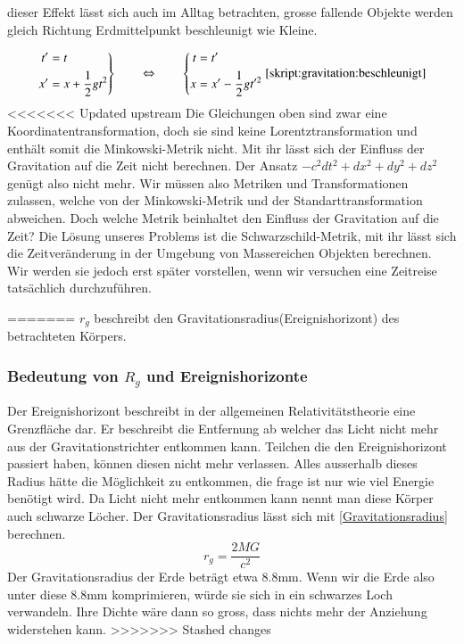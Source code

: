 \begin{refsection}
	dieser Effekt lässt sich auch im Alltag betrachten, grosse fallende Objekte werden gleich Richtung Erdmittelpunkt beschleunigt wie Kleine.
	
	\begin{equation}
	\left.
	\begin{aligned}
	t'&=t\\
	x'&=x+\frac12gt^2
	\end{aligned}
	\right\}
	\qquad
	\Leftrightarrow
	\qquad
	\left\{
	\begin{aligned}
	t&=t'\\
	x&=x'-\frac12gt'^2
	\end{aligned}
	\right.
	\eqref{skript:gravitation:beschleunigt}
	\end{equation}
<<<<<<< Updated upstream
	Die Gleichungen oben sind zwar eine Koordinatentransformation, doch sie sind keine Lorentztransformation und enthält somit die Minkowski-Metrik nicht. Mit ihr lässt sich der Einfluss der Gravitation auf die Zeit nicht berechnen. 
	Der Ansatz $ -c^2dt^2 + dx^2 + dy^2 + dz^2$ genügt also nicht mehr. Wir müssen also Metriken und Transformationen zulassen, welche von der Minkowski-Metrik und der Standarttransformation abweichen.
	Doch welche Metrik beinhaltet den Einfluss der Gravitation auf die Zeit? 
	Die Lösung unseres Problems ist die Schwarzschild-Metrik, mit ihr lässt sich die Zeitveränderung in der Umgebung von Massereichen Objekten berechnen. Wir werden sie jedoch erst später vorstellen, wenn wir versuchen eine Zeitreise tatsächlich durchzuführen. %
	
	
	
	
=======
	$r_g$ beschreibt den Gravitationsradius(Ereignishorizont) des betrachteten Körpers.
	\subsubsection{Bedeutung von $R_{g}$ und Ereignishorizonte}
	Der Ereignishorizont beschreibt in der allgemeinen Relativitätstheorie eine Grenzfläche dar. Er beschreibt die Entfernung ab welcher das Licht nicht mehr aus der Gravitationstrichter entkommen kann. Teilchen die den Ereignishorizont passiert haben, können diesen nicht mehr verlassen. Alles ausserhalb dieses Radius hätte die M\"oglichkeit zu entkommen, die frage ist nur wie viel Energie benötigt wird. Da Licht nicht mehr entkommen kann nennt man diese Körper auch schwarze Löcher.
	Der Gravitationsradius lässt sich mit \ref{Gravitationsradius} berechnen.
	\begin{equation} \label{Gravitationsradius}
		r_{g}= \frac{2MG}{c^2}
	\end{equation}
    Der Gravitationsradius der Erde beträgt etwa 8.8mm. Wenn wir die Erde also unter diese 8.8mm komprimieren, würde sie sich in ein schwarzes Loch verwandeln. Ihre Dichte wäre dann so gross, dass nichts mehr der Anziehung widerstehen kann.
>>>>>>> Stashed changes
	

\end{refsection}
